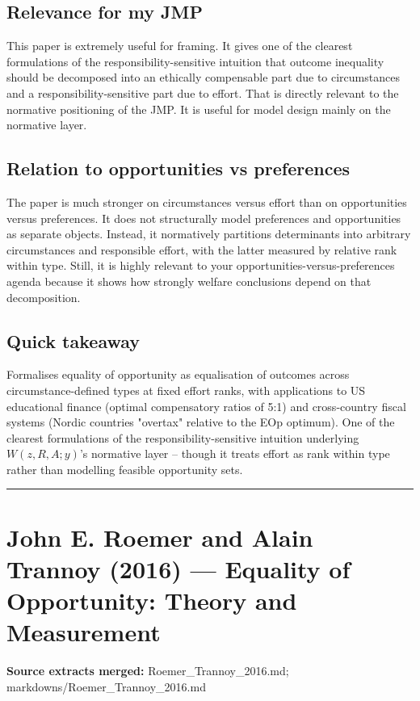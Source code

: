 \documentclass[11pt,a4paper]{article}
\begin{document}
\subsection*{Relevance for my JMP}
This paper is extremely useful for framing. It gives one of the clearest formulations of the responsibility-sensitive intuition that outcome inequality should be decomposed into an ethically compensable part due to circumstances and a responsibility-sensitive part due to effort. That is directly relevant to the normative positioning of the JMP. It is useful for model design mainly on the normative layer.

\subsection*{Relation to opportunities vs preferences}
The paper is much stronger on circumstances versus effort than on opportunities versus preferences. It does not structurally model preferences and opportunities as separate objects. Instead, it normatively partitions determinants into arbitrary circumstances and responsible effort, with the latter measured by relative rank within type. Still, it is highly relevant to your opportunities-versus-preferences agenda because it shows how strongly welfare conclusions depend on that decomposition.

\subsection*{Quick takeaway}
Formalises equality of opportunity as equalisation of outcomes across circumstance-defined types at fixed effort ranks, with applications to US educational finance (optimal compensatory ratios of 5:1) and cross-country fiscal systems (Nordic countries "overtax" relative to the EOp optimum). One of the clearest formulations of the responsibility-sensitive intuition underlying $W(z,R,A;y)$'s normative layer -- though it treats effort as rank within type rather than modelling feasible opportunity sets.


\medskip\hrule\medskip

\section*{John E. Roemer and Alain Trannoy (2016) — Equality of Opportunity: Theory and Measurement}

\textbf{Source extracts merged:} Roemer\_Trannoy\_2016.md; markdowns/Roemer\_Trannoy\_2016.md
\end{document}
